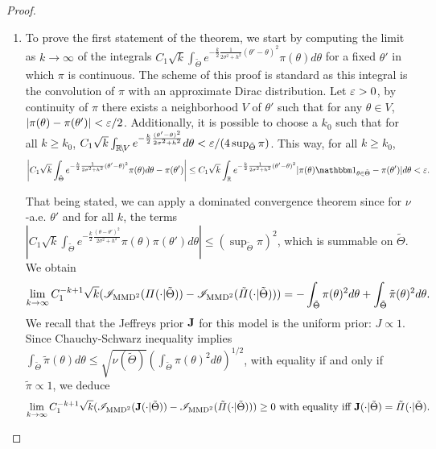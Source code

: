 \begin{proof}
\begin{enumerate}
    \item To prove the first statement of the theorem, 
    we start by  computing the limit as $k\to\infty$ of the integrals  $C_1\sqrt{k}\int_{\tilde\Theta}e^{-\frac{k}{2}\frac{1}{2\sigma^2+h^2}(\theta'-\theta)^2}\pi(\theta)d\theta $ for a fixed $\theta'$ in which $\pi$ is continuous. The scheme of this proof is standard as this integral is the convolution of  $\pi$ with an approximate Dirac distribution. %
    Let $\varepsilon>0$, by continuity of $\pi$ there exists a neighborhood $V$ of $\theta'$ such that for any $\theta\in V$,  $|\pi(\theta)-\pi(\theta')|<\varepsilon/2$. %
    Additionally, it is possible to choose a $k_0$ such that for all $k\geq k_0$, $C_1\sqrt{k}\int_{\mathbb{R}\!\setminus\!V} e^{-\frac{k}{2}\frac{(\theta'-\theta)^2}{2\sigma^2+h^2}}d\theta <\varepsilon/(4\sup_{\tilde\Theta}\pi)$. This way, for all $k\geq k_0$,
        \begin{equation}
            \left|C_1\sqrt{k}\int_{\tilde\Theta}e^{-\frac{k}{2}\frac{1}{2\sigma^2+h^2}(\theta'-\theta)^2}\pi(\theta)d\theta -\pi(\theta')  \right| \leq C_1\sqrt{k}\int_{\RR}e^{-\frac{k}{2}\frac{1}{2\sigma^2+h^2}(\theta'-\theta)^2} |\pi(\theta)\indic_{\theta\in\tilde\Theta}-\pi(\theta')|d\theta 
            <\eps.
        \end{equation}
    
    That being stated, we can apply a dominated convergence theorem since for $\nu$-a.e. $\theta'$ and for all $k$, the terms $|C_1\sqrt{k}\int_{\tilde\Theta} e^{-\frac{k}{2}\frac{(\theta-\theta')^2}{2\sigma^2+h^2}}\pi(\theta)\pi(\theta')d\theta |\leq(\sup_{\tilde\Theta}\pi)^2$, which is summable on $\tilde\Theta$.
    We obtain
    \begin{equation}
        \lim_{k\rightarrow\infty} C_1^{-k+1}\sqrt{k}(\mathscr{I}_{\text{MMD}^2}(\varPi(\cdot|\tilde\Theta))-\mathscr{I}_{\text{MMD}^2}(\tilde\varPi(\cdot|\tilde\Theta)) ) = -\int_{\tilde\Theta}\pi(\theta)^2d\theta + \int_{\tilde\Theta}\tilde\pi(\theta)^2d\theta.
    \end{equation}
    We recall that the Jeffreys prior $\mathbf{J} $ for this model is the uniform prior: $J\propto 1$.
    Since Chauchy-Schwarz inequality implies $\int_{\tilde\Theta}\tilde\pi(\theta)d\theta \leq \sqrt{\nu(\tilde\Theta)} \left(\int_{\tilde\Theta}\pi(\theta)^2d\theta \right)^{1/2}$, with equality if and only if $\tilde\pi\propto 1$, we deduce 
    \begin{equation}
        \lim_{k\rightarrow\infty} C_1^{-k+1}\sqrt{k}(\mathscr{I}_{\text{MMD}^2}(\mathbf{J}(\cdot|\tilde\Theta))-\mathscr{I}_{\text{MMD}^2}(\tilde\varPi(\cdot|\tilde\Theta)) ) \geq 0 \text{\ with equality iff\ }\mathbf{J}(\cdot|\tilde\Theta) = \tilde\varPi(\cdot|\tilde\Theta).
    \end{equation}


\end{enumerate}
\end{proof}
